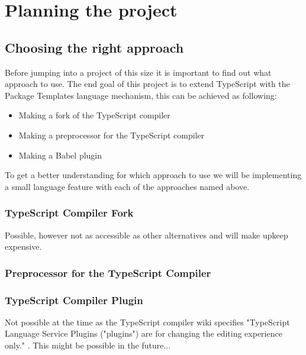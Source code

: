 
\chapter{Planning the project}\label{ch:planning-the-project}

\section{Choosing the right approach}\label{sec:choosing-the-right-approach}

Before jumping into a project of this size it is important to find out what approach to use.
The end goal of this project is to extend TypeScript with the Package Templates language mechanism,
this can be achieved as following:

\begin{itemize}
    \item Making a fork of the TypeScript compiler
    \item Making a preprocessor for the TypeScript compiler
    \item Making a Babel plugin
\end{itemize}

To get a better understanding for which approach to use we will be implementing a small language feature with each of the approaches named above.

\subsection{TypeScript Compiler Fork}\label{subsec:typescript-compiler-fork}

Possible, however not as accessible as other alternatives and will make upkeep expensive.

\subsection{Preprocessor for the TypeScript Compiler}\label{subsec:preprocessor-for-the-typescript-compiler}

\subsection{TypeScript Compiler Plugin}\label{subsec:typescript-compiler-plugin}

Not possible at the time as the TypeScript compiler wiki specifies "TypeScript Language Service Plugins ("plugins") are for changing the editing experience only." \cite{tscplugin}.
This might be possible in the future...

